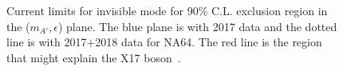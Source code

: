 \begin{figure}[t!]
\begin{minipage}[t]{.45\textwidth}
    \caption{Current limits for invisible mode for 90\% C.L. exclusion region in the ($m_{A'},\epsilon$) plane. The blue plane is with 2017 data and the dotted line is with 2017+2018 data for NA64. The red line is the region that might explain the X17 boson~\cite{}.}
    \label{fig:exclusion_visible}
  \end{minipage}
\end{figure}


